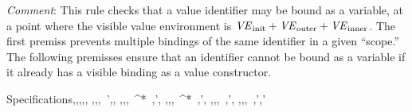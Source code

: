 \par\noindent\emph{Comment}: This rule checks that a value identifier
may be bound as a variable, at a point where the visible value environment is
$\mbox{\textit{VE}}_{\mathrm{init}}+\mbox{\textit{VE}}_{\mathrm{outer}}+\mbox{\textit{VE}}_{\mathrm{inner}}$.
The first premiss prevents multiple bindings of the same identifier in
a given ``scope.''
The following premisses ensure that an identifier cannot be bound
as a variable if it already has a visible binding as a value constructor.

\begin{relation}{Specifications}{\ME,\TE,\VE,\vdash{}\Rightarrow\ME,\TE,\VE}
	{\ME,\TE,\VE,\vdash{}~\Rightarrow\ME',\TE,\VE}
\rruleskip
{}
	{\ME,\TE,\VE,\vdash{}~\alpha^{*}~\Rightarrow\ME,\TE',\VE}
\rruleskip
{}
	{\ME,\TE,\VE,\vdash{}~\alpha^{*}~\Rightarrow\ME,\TE',\VE}
\rruleskip
{}
	{\ME,\TE,\VE,\vdash{}~\Rightarrow\ME,\TE',\VE}
\rruleskip
{}
	{\ME,\TE,\VE,\vdash{}~\Rightarrow\ME,\TE',\VE'}
\rruleskip
{}
\end{relation}
